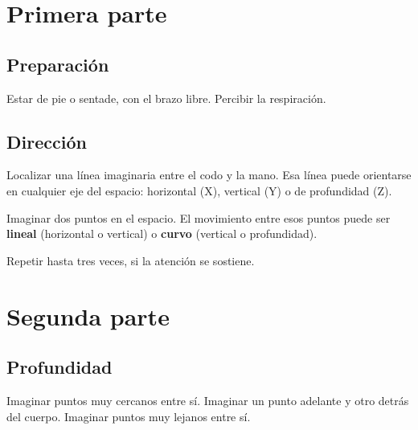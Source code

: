 \documentclass[spanish]{report}
\begin{document}
\begin{center}
\begin{tcolorbox}[
            breakable,
            title=Partitura Instructiva de Celuido,
            colback=gray!5,
            colframe=black,
            fonttitle=\bfseries,
            arc=2mm,
            boxrule=0.5pt
        ]

        \section*{Primera parte}

        \subsection*{Preparación}

        Estar de pie o sentade, con el brazo libre.  
        Percibir la respiración.

        \medskip

        \subsection*{Dirección}

        Localizar una línea imaginaria entre el codo y la mano.  
        Esa línea puede orientarse en cualquier eje del espacio: horizontal (X), vertical (Y) o de profundidad (Z).

        Imaginar dos puntos en el espacio.  
        El movimiento entre esos puntos puede ser \textbf{lineal} (horizontal o vertical)  
        o \textbf{curvo} (vertical o profundidad).

        Repetir hasta tres veces, si la atención se sostiene.

        \bigskip

        \section*{Segunda parte}

        \subsection*{Profundidad}

        Imaginar puntos muy cercanos entre sí.  
        Imaginar un punto adelante y otro detrás del cuerpo.  
        Imaginar puntos muy lejanos entre sí.

        \medskip


\end{tcolorbox}
\end{center}
\end{document}
